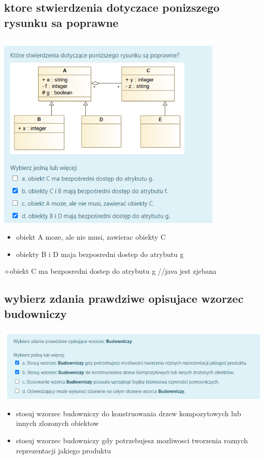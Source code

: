 \documentclass[11pt]{article}
\begin{document}
\subsection{ktore stwierdzenia dotyczace ponizszego rysunku sa poprawne}
\label{sec:org0164d3b}
\begin{center}
\includegraphics[width=.9\linewidth]{./zadanie11.png}
\end{center}
\begin{itemize}
\item obiekt A moze, ale nie musi, zawierac obiekty C
\item obiekty B i D maja bezposredni dostep do atrybutu g
\end{itemize}

+obiekt C ma bezposredni dostep do atrybutu g //java jest zjebana
\subsection{wybierz zdania prawdziwe opisujace wzorzec budowniczy}
\label{sec:orgeb400fd}
\begin{center}
\includegraphics[width=.9\linewidth]{./zadanie13.png}
\end{center}
\begin{itemize}
\item stosuj wzorzec budowniczy do konstruowania drzew kompozytowych lub innych zlozonych obiektow
\item stosuj wzorzec budowniczy gdy potrzebujesz mozliwosci tworzenia roznych reprezentacji jakiego produktu
\end{itemize}
\end{document}
